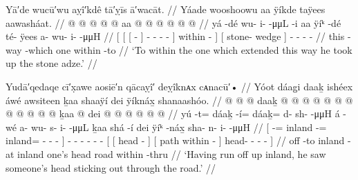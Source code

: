 \ex\label{ex:91-187-pick-up-stone-adze-within-one-extended}%
%
\begingl
	\glpreamble	Yā′de wucū′wu aỵî′kdê tā′ỵīs ā′wacāt. //
	\glpreamble	Yáade wooshoowu aa ÿíkde taÿees aawasháat. //
	\gla	{} {} {}  @ {} {}
				 @ {} @ {} @ {} @ {} {}
			aa  @ {} {} 
		{}  @ {} {}
		 @ {} @ {} @ {} @ {} //
	\glb	{} {} {} yá -dé {}
				wu- i-  -μμL -i {}
			 aa ÿíᵏ -dé {}
		{} té- ÿees {}
		a- wu- i-  -μμH //
	\glc	{}[ {}[ {}[  - {}]
				- -  - - {}]
			 within - {}]
		{}[ stone- wedge {}]
		- - -  - //
	\gld	{} {} {} this -way {}  {} {} {} -which {}
			one within -to {}
		{}  {} {}
		 {} {} {} {} //
	\glft	‘To within the one which extended this way he took up the stone adze.’
		//
\endgl
\xe

\ex\label{ex:91-188-run-off-inland-saw-head-sticking-out}%
%
\begingl
	\glpreamble	Yudā′qedaqe cī′x̣awe aosiē′n qācaỵî′ deỵîknᴀx cᴀnacū′• //
	\glpreamble	Yóot dáag̱i daaḵ ishéex áwé awsiteen ḵaa shaaÿí dei ÿíknáx̱ shanaashóo. //
	\gla	{}  @ {}  @ {} @ daaḵ @
			 @ {} @ {} @ {} @ {} @ {} {}
		 @ {}
		 @ {} @ {} @ {} @ {} @ {}
		{} {} ḵaa  @ {} {}
			{} dei  @ {} {}
			 @ {} @ {} @ {} @ {} @ {} {} //
	\glb	{} yú -t= dáaḵ -í= dáaḵ= {} d- sh-  -μμH {} {}
		á -wé
		a- wu- s- i-  -μμL
		{} {} ḵaa shá -í {}
			{} dei ÿíᵏ -náx̱ {}
			sha- n- i-  -μμH {} {} //
	\glc	{}[  -= inland -= inland=
			\· - -  - \· {}]
		 -
		- - - -  -
		{}[ {}[  head - {}]
			{}[ path within - {}]
			head- - -  - \· {}] //
	\gld	{} off -to inland -at inland
			 {} {} {} {} {} {}
		 {}
		 {} {} {} {} {}
		{} {} one’s head {} {}
			{} road within -thru {}
			 {} {} {} {} {} {} //
	\glft	‘Having run off up inland, he saw someone’s head sticking out through the road.’
		//
\endgl
\xe

